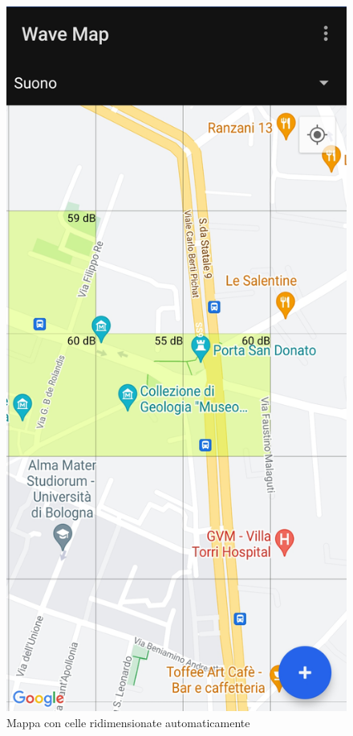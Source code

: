 \documentclass[11pt]{article}
\begin{document}
\begin{figure}[H]
\begin{minipage}[b]{0.25\textwidth}
    \end{minipage}
    \hspace*{1cm}
    \begin{minipage}[b]{0.25\textwidth}
      \includegraphics[width=\textwidth]{./img/overview/map_zoom2.jpg}
    \end{minipage}
    \caption{Mappa con celle ridimensionate automaticamente} \label{fig:overview_map}
\end{figure}
\end{document}
